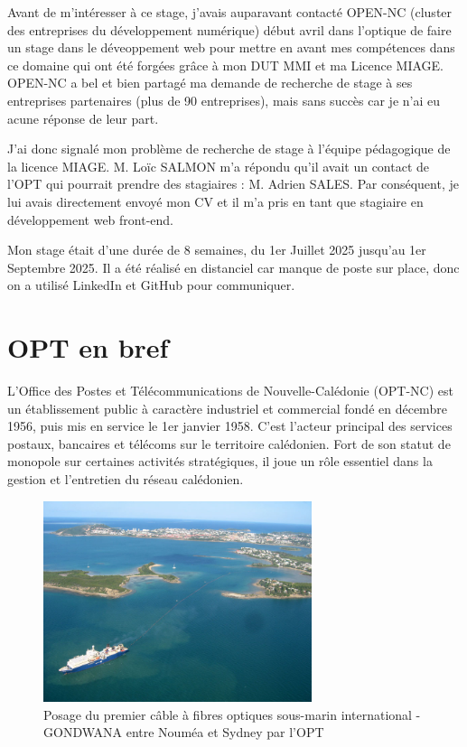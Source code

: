 \documentclass[12pt,a4paper]{report}
\begin{document}
\vspace{1cm}
Avant de m'intéresser à ce stage, j'avais auparavant contacté OPEN-NC (cluster des entreprises du développement numérique) début avril dans l'optique de faire un stage dans le déveoppement web pour mettre en avant mes compétences dans ce domaine qui ont été forgées grâce à mon DUT MMI et ma Licence MIAGE. OPEN-NC a bel et bien partagé ma demande de recherche de stage à ses entreprises partenaires (plus de 90 entreprises), mais sans succès car je n'ai eu acune réponse de leur part.

\vspace{1cm}
J'ai donc signalé mon problème de recherche de stage à l'équipe pédagogique de la licence MIAGE. M. Loïc SALMON m'a répondu qu'il avait un contact de l'OPT qui pourrait prendre des stagiaires : M. Adrien SALES. Par conséquent, je lui avais directement envoyé mon CV et il m'a pris en tant que stagiaire en développement web front-end.

\vspace{1cm}
Mon stage était d'une durée de 8 semaines, du 1er Juillet 2025 jusqu'au 1er Septembre 2025. Il a été réalisé en distanciel car manque de poste sur place, donc on a utilisé LinkedIn et GitHub pour communiquer.


\section{OPT en bref}
L’Office des Postes et Télécommunications de Nouvelle-Calédonie (OPT-NC) est un établissement public à caractère industriel et commercial fondé en décembre 1956, puis mis en service le 1er janvier 1958. C'est l’acteur principal des services postaux, bancaires et télécoms sur le territoire calédonien. Fort de son statut de monopole sur certaines activités stratégiques, il joue un rôle essentiel dans la gestion et l'entretien du réseau calédonien.

\vspace{1cm}

\begin{figure}[h] %
    \centering
    \includegraphics[width=0.7\textwidth]{ressources_rapport/pose-cable-gondwana.jpg}
    \caption{Posage du premier câble à fibres optiques sous-marin international - GONDWANA entre Nouméa et Sydney par l'OPT}
\end{figure}
\newpage
\end{document}
